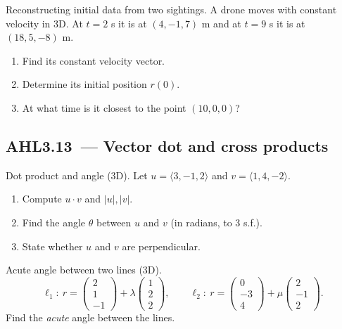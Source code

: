 \documentclass[11pt]{article}
\def\textbf#1{#1}%
\def\mathbf#1{#1}%
\newcommand{\tocsubsection}[1]{\subsection{#1}}
\newcounter{question}
\begin{document}
\begin{question}
\textbf{Reconstructing initial data from two sightings.}
A drone moves with constant velocity in 3D. At \(t=2\) s it is at \((4,-1,7)\) m and at \(t=9\) s it is at \((18,5,-8)\) m.
\begin{enumerate}
  \item Find its constant velocity vector.
  \item Determine its initial position \(\mathbf{r}(0)\).
  \item At what time is it closest to the point \((10,0,0)\)?
\end{enumerate}
\end{question}



\tocsubsection{AHL3.13 — Vector dot and cross products}


\begin{question}
\textbf{Dot product and angle (3D).}
Let \(\mathbf{u}=\langle 3,-1,2\rangle\) and \(\mathbf{v}=\langle 1,4,-2\rangle\).
\begin{enumerate}
  \item Compute \(\mathbf{u}\cdot\mathbf{v}\) and \(|\mathbf{u}|,|\mathbf{v}|\).
  \item Find the angle \(\theta\) between \(\mathbf{u}\) and \(\mathbf{v}\) (in radians, to 3 s.f.).
  \item State whether \(\mathbf{u}\) and \(\mathbf{v}\) are perpendicular.
\end{enumerate}
\end{question}

\begin{question}
\textbf{Acute angle between two lines (3D).}
\[
\ell_1:\ \mathbf{r}=\begin{pmatrix} 2\\ 1\\ -1\end{pmatrix}
+\lambda\begin{pmatrix} 1\\ 2\\ 2\end{pmatrix},\qquad
\ell_2:\ \mathbf{r}=\begin{pmatrix} 0\\ -3\\ 4\end{pmatrix}
+\mu\begin{pmatrix} 2\\ -1\\ 2\end{pmatrix}.
\]
Find the \emph{acute} angle between the lines.
\end{question}
\end{document}
